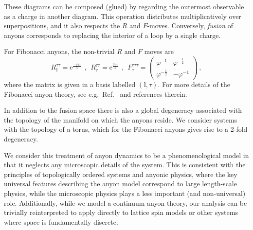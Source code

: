\documentclass[aps, prl, letterpaper, twocolumn, superscriptaddress, notitlepage, 10pt]{revtex4}
\newcommand{\e}{\mathrm{e}}
\newcommand{\vac}{\mathbb{I}}
\newcommand{\dude}[1]{\textcolor{red}{#1}}
\begin{document}
These diagrams can be composed (glued)
by regarding the outermost observable
as a charge in another diagram.
This operation distributes multiplicatively
over superpositions, and it also respects the $R$ and $F$-moves.
Conversely, \emph{fusion} of anyons corresponds to 
replacing the interior of a loop by a single charge.



For Fibonacci anyons, the non-trivial $R$ and $F$ moves are 
\begin{equation*}
	R_{\vac}^{\tau\tau} = \e^{\frac{-4\pi i}{5}} 
	\ \ , \ \
	R_\tau^{\tau\tau}= \e^{\frac{3\pi i}{5}} 
	\ \ , \ \
	F_{\tau}^{\tau\tau\tau} = \begin{pmatrix}\varphi^{-1}&\varphi^{-\frac{1}{2}}\\\varphi^{-\frac{1}{2}}&-\varphi^{-1}\end{pmatrix} \,,
\end{equation*}
where the matrix is given in a basis labelled $(\vac,\tau)$. For more details of the Fibonacci anyon theory, see e.g.\ Ref.~\cite{Nayak2008} and references therein. 

In addition to the fusion space there is also a global degeneracy associated with the topology of the 
manifold on which the anyons reside. We consider systems with the topology of a torus, 
which for the Fibonacci anyons gives rise to a 2-fold degeneracy.

We consider this treatment of anyon dynamics to be a phenomenological model in that
it neglects any microscopic details of the system.
This is consistent with the principles of topologically 
ordered systems and anyonic physics, where the key universal features describing the 
anyon model correspond to large length-scale physics, while the microscopic physics plays 
a less important (and non-universal) role.
Additionally, while we model a continuum anyon theory, our analysis can be trivially reinterpreted to apply directly to lattice spin models or other systems where space is fundamentally discrete.
\end{document}

